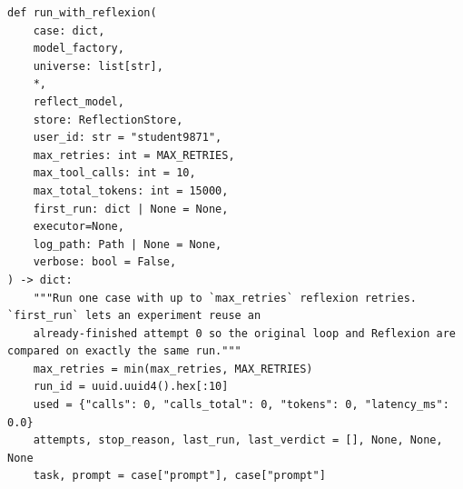 \documentclass[11pt]{article}
\begin{document}
\begingroup\lstset{basicstyle=\ttfamily\tiny}
\begin{lstlisting}
def run_with_reflexion(
    case: dict,
    model_factory,
    universe: list[str],
    *,
    reflect_model,
    store: ReflectionStore,
    user_id: str = "student9871",
    max_retries: int = MAX_RETRIES,
    max_tool_calls: int = 10,
    max_total_tokens: int = 15000,
    first_run: dict | None = None,
    executor=None,
    log_path: Path | None = None,
    verbose: bool = False,
) -> dict:
    """Run one case with up to `max_retries` reflexion retries. `first_run` lets an experiment reuse an
    already-finished attempt 0 so the original loop and Reflexion are compared on exactly the same run."""
    max_retries = min(max_retries, MAX_RETRIES)
    run_id = uuid.uuid4().hex[:10]
    used = {"calls": 0, "calls_total": 0, "tokens": 0, "latency_ms": 0.0}
    attempts, stop_reason, last_run, last_verdict = [], None, None, None
    task, prompt = case["prompt"], case["prompt"]


\end{lstlisting}
\end{document}
